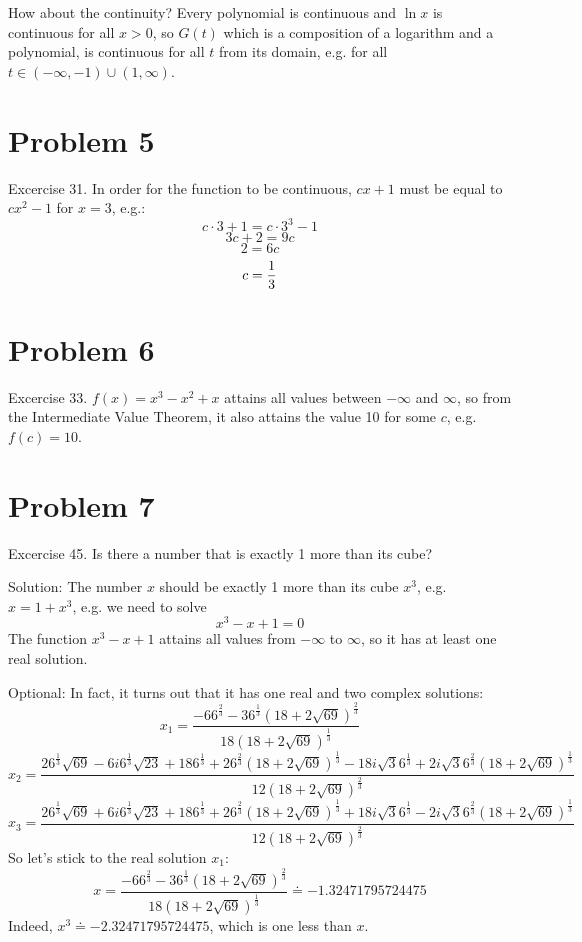 \documentclass[10pt]{article}
\begin{document}
How about the continuity? Every polynomial is continuous and $\ln x$ is
continuous for all $x>0$, so $G(t)$ which is a composition of a logarithm and a
polynomial, is continuous for all $t$ from its domain, e.g. for all
$t\in (-\infty, -1) \cup (1, \infty)$.

\section{Problem 5}

Excercise 31. In order for the function to be continuous, $cx+1$ must be equal
to $cx^2-1$ for $x=3$, e.g.:
$$c\cdot3+1 = c\cdot 3^3-1$$
$$3c+2 = 9c$$
$$2 = 6c$$
$$c = {1\over3}$$

\section{Problem 6}

Excercise 33. $f(x) = x^3-x^2+x$ attains all values between $-\infty$ and
$\infty$, so from the Intermediate Value Theorem, it also attains the value 10
for some $c$, e.g. $f(c)=10$.

\section{Problem 7}

Excercise 45. Is there a number that is exactly 1 more than its cube?

Solution: The number $x$ should be exactly 1 more than its cube $x^3$, e.g.
$x=1+x^3$, e.g. we need to solve
$$x^3-x+1=0$$
The function $x^3-x+1$ attains all values from $-\infty$ to $\infty$, so it has
at least one real solution.

Optional: In fact, it turns out that
it has one real and two complex solutions:
$$x_1=\frac{- 6 6^{\frac{2}{3}} - 3 6^{\frac{1}{3}} \left(18 + 2
\sqrt{69}\right)^{\frac{2}{3}}}{18 \left(18 + 2
\sqrt{69}\right)^{\frac{1}{3}}}$$
$$x_2=\frac{2 6^{\frac{1}{3}} \sqrt{69} - 6
i 6^{\frac{1}{3}} \sqrt{23} + 18 6^{\frac{1}{3}} + 2
6^{\frac{2}{3}} \left(18 + 2 \sqrt{69}\right)^{\frac{1}{3}} - 18
i \sqrt{3} 6^{\frac{1}{3}} + 2 i \sqrt{3}
6^{\frac{2}{3}} \left(18 + 2 \sqrt{69}\right)^{\frac{1}{3}}}{12 \left(18 + 2
\sqrt{69}\right)^{\frac{2}{3}}}$$
$$x_3=\frac{2 6^{\frac{1}{3}} \sqrt{69} + 6
i 6^{\frac{1}{3}} \sqrt{23} + 18 6^{\frac{1}{3}} + 2
6^{\frac{2}{3}} \left(18 + 2 \sqrt{69}\right)^{\frac{1}{3}} + 18
i \sqrt{3} 6^{\frac{1}{3}} - 2 i \sqrt{3}
6^{\frac{2}{3}} \left(18 + 2 \sqrt{69}\right)^{\frac{1}{3}}}{12 \left(18 + 2
\sqrt{69}\right)^{\frac{2}{3}}}$$
So let's stick to the real solution $x_1$:
$$x=\frac{- 6 6^{\frac{2}{3}} - 3 6^{\frac{1}{3}} \left(18 + 2
\sqrt{69}\right)^{\frac{2}{3}}}{18 \left(18 + 2
\sqrt{69}\right)^{\frac{1}{3}}}\doteq-1.32471795724475$$
Indeed, $x^3\doteq-2.32471795724475$, which is one less than $x$.
\end{document}
